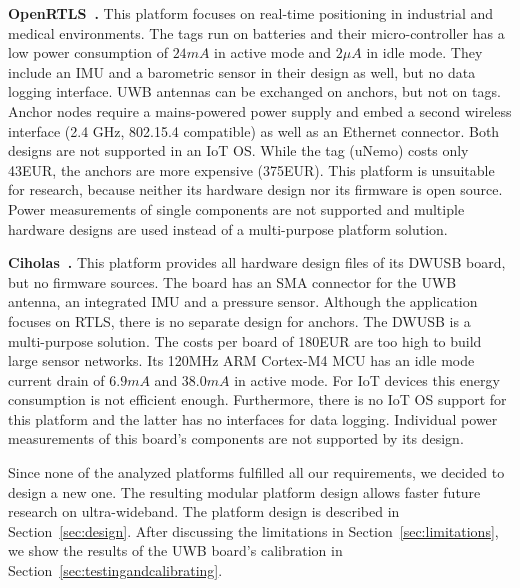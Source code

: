 \documentclass[journal,comsoc]{IEEEtran}
\begin{document}
\vspace*{0.5em}
\noindent\textbf{OpenRTLS~\cite{openrtlswebsite}.} This platform focuses on real-time positioning in industrial and medical environments. 
The tags run on batteries and their micro-controller has a low power consumption of $24mA$ in active mode and $2\mu A$ in idle mode. 
They include an IMU and a barometric sensor in their design as well, but no data logging interface. 
UWB antennas can be exchanged on anchors, but not on tags. 
Anchor nodes require a mains-powered power supply and embed a second wireless interface (2.4 GHz, 802.15.4 compatible) as well as an Ethernet connector. 
Both designs are not supported in an IoT OS. 
While the tag (uNemo) costs only 43EUR, the anchors are more expensive (375EUR).
This platform is unsuitable for research, because neither its hardware design nor its firmware is open source.
Power measurements of single components are not supported and multiple hardware designs are used instead of a multi-purpose platform solution.

\vspace*{0.5em}
\noindent\textbf{Ciholas~\cite{ciholaswebsite}.} This platform provides all hardware design files of its DWUSB board, but no firmware sources. 
The board has an SMA connector for the UWB antenna, an integrated IMU and a pressure sensor. 
Although the application focuses on RTLS, there is no separate design for anchors. 
The DWUSB is a multi-purpose solution. 
The costs per board of 180EUR are too high to build large sensor networks. 
Its 120MHz ARM Cortex-M4 MCU has an idle mode current drain of $6.9mA$ and $38.0mA$ in active mode.
For IoT devices this energy consumption is not efficient enough. 
Furthermore, there is no IoT OS support for this platform and the latter has no interfaces for data logging. 
Individual power measurements of this board's components are not supported by its design. 

\vspace*{0.5em}
Since none of the analyzed platforms fulfilled all our requirements, we decided to design a new one. 
The resulting modular platform design allows faster future research on ultra-wideband. 
The platform design is described in Section~\ref{sec:design}. 
After discussing the limitations in Section~\ref{sec:limitations}, we show the results of the UWB board's calibration in Section~\ref{sec:testingandcalibrating}. 

\end{document}
